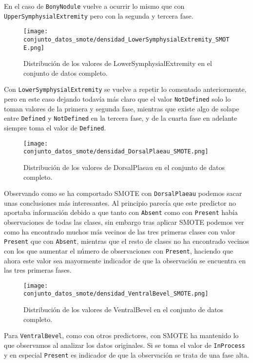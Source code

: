 En el caso de \texttt{BonyNodule} vuelve a ocurrir lo mismo que con \texttt{UpperSymphysialExtremity} pero con la segunda y tercera fase.


\begin{figure}[H]
	\centering
	\texttt{[image: conjunto\_datos\_smote/densidad\_LowerSymphysialExtremity\_SMOTE.png]}
	\caption{Distribución de los valores de LowerSymphysialExtremity en el conjunto de datos completo.}
	\label{fig:densidad_LowerSymphysialExtremity_SMOTE}
\end{figure}

Con \texttt{LowerSymphysialExtremity} se vuelve a repetir lo comentado anteriormente, pero en este caso dejando todavía más claro que el valor \texttt{NotDefined} solo lo toman valores de la primera y segunda fase, mientras que existe algo de solape entre \texttt{Defined} y \texttt{NotDefined} en la tercera fase, y de la cuarta fase en adelante siempre toma el valor de \texttt{Defined}.

\begin{figure}[H]
	\centering
	\texttt{[image: conjunto\_datos\_smote/densidad\_DorsalPlaeau\_SMOTE.png]}
	\caption{Distribución de los valores de DorsalPlaeau en el conjunto de datos completo.}
	\label{fig:densidad_DorsalPlaeau_SMOTE}
\end{figure}

Observando como se ha comportado SMOTE con \texttt{DorsalPlaeau} podemos sacar unas conclusiones más interesantes. Al principio parecía que este predictor no aportaba información debido a que tanto con \texttt{Absent} como con \texttt{Present} había observaciones de todas las clases, sin embargo tras aplicar SMOTE podemos ver como ha encontrado muchos más vecinos de las tres primeras clases con valor \texttt{Present} que con \texttt{Absent}, mientras que el resto de clases no ha encontrado vecinos con los que aumentar el número de observaciones con \texttt{Present}, haciendo que ahora este valor sea mayormente indicador de que la observación se encuentra en las tres primeras fases.

\begin{figure}[H]
	\centering
	\texttt{[image: conjunto\_datos\_smote/densidad\_VentralBevel\_SMOTE.png]}
	\caption{Distribución de los valores de VentralBevel en el conjunto de datos completo.}
	\label{fig:densidad_VentralBevel_SMOTE}
\end{figure}

Para \texttt{VentralBevel}, como con otros predictores, con SMOTE ha mantenido lo que observamos al analizar los datos originales. Si se toma el valor de \texttt{InProcess} y en especial \texttt{Present} es indicador de que la observación se trata de una fase alta.


